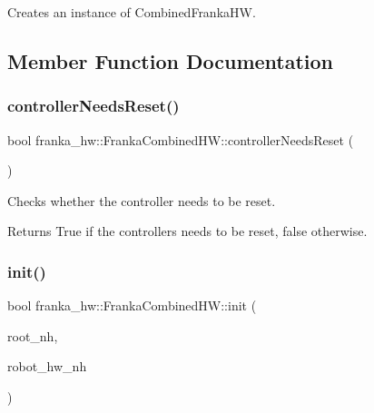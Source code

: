Creates an instance of Combined\+Franka\+HW. 

\subsection{Member Function Documentation}
\mbox{\label{classfranka__hw_1_1_franka_combined_h_w_aca9156d9a9d557288db9d1d496ff8306}} 
\subsubsection{\texorpdfstring{controller\+Needs\+Reset()}{controllerNeedsReset()}}
{\footnotesize\ttfamily bool franka\+\_\+hw\+::\+Franka\+Combined\+H\+W\+::controller\+Needs\+Reset (\begin{DoxyParamCaption}{ }\end{DoxyParamCaption})}

Checks whether the controller needs to be reset.

\begin{DoxyReturn}{Returns}
True if the controllers needs to be reset, false otherwise. 
\end{DoxyReturn}
\mbox{\label{classfranka__hw_1_1_franka_combined_h_w_ae790d07b59ec430f743994b8d4119178}} 
\subsubsection{\texorpdfstring{init()}{init()}}
{\footnotesize\ttfamily bool franka\+\_\+hw\+::\+Franka\+Combined\+H\+W\+::init (\begin{DoxyParamCaption}\item[{ros\+::\+Node\+Handle \&}]{root\+\_\+nh,  }\item[{ros\+::\+Node\+Handle \&}]{robot\+\_\+hw\+\_\+nh }\end{DoxyParamCaption})\hspace{0.3cm}{\ttfamily [override]}}


